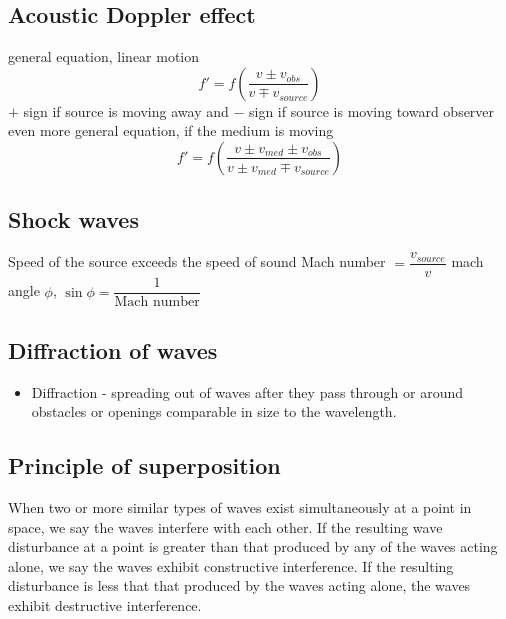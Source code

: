 \documentclass[twocolumn]{article}
\begin{document}
\subsection{Acoustic Doppler effect}
\begin{outline}
    \1 general equation, linear motion \[f'=f\left(\dfrac{v\pm v_{obs}}{v\mp v_{source}}\right)\]
    \1 $+$ sign if source is moving away and $-$ sign if source is moving toward observer
    \1 even more general equation, if the medium is moving \[f'=f\left(\dfrac{v\pm v_{med}\pm v_{obs}}{v\pm v_{med}\mp v_{source}}\right)\]
\end{outline}
\subsection{Shock waves}
\begin{outline}
    \1 Speed of the source exceeds the speed of sound
    \1 Mach number $=\dfrac{v_{source}}{v}$
    \1 mach angle $\phi$,  \(\sin\phi=\dfrac{1}{\text{Mach number}}\)
\end{outline}
\subsection{Diffraction of waves}
\begin{itemize}
    \item Diffraction - spreading out of waves after they pass through or around obstacles or openings comparable in size to the wavelength. 
\end{itemize}
\subsection{Principle of superposition}
\begin{outline}
\1 When two or more similar types of waves exist simultaneously at a point in space, we say the waves interfere with each other. If the resulting wave disturbance at a point is greater than that produced by any of the waves acting alone, we say the waves exhibit constructive interference. If the resulting disturbance is less that that produced by the waves acting alone, the waves exhibit destructive interference. 
\end{outline}
\end{document}
